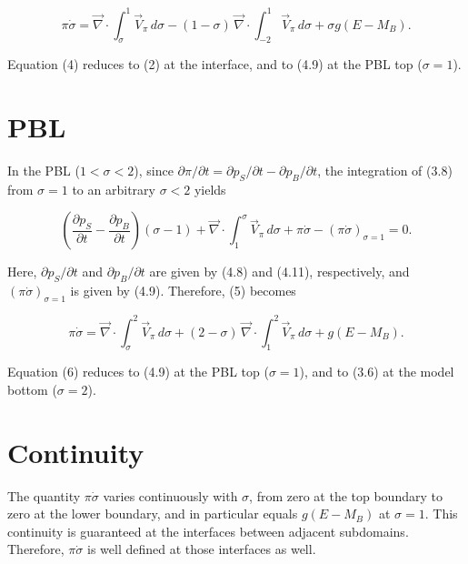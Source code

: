 \documentclass[12pt,openany]{book}
\begin{document}
\begin{equation}
\pi \dot{\sigma}
=
\vec{\nabla} \cdot \int_{\sigma}^{1} \vec{V}_{\pi} \, d\sigma
-
(1 - \sigma)\,
\vec{\nabla} \cdot \int_{-2}^{1} \vec{V}_{\pi} \, d\sigma
+
\sigma g (E - M_B) .
\tag{5.4}
\label{eq:5.4}
\end{equation}

Equation (4) reduces to (2) at the interface, and to (4.9) at the PBL top
($\sigma = 1$).

\section{PBL}

In the PBL ($1 < \sigma < 2$), since
$\partial \pi / \partial t = \partial p_S / \partial t - \partial p_B / \partial t$,
the integration of (3.8) from $\sigma = 1$ to an arbitrary $\sigma < 2$ yields

\begin{equation}
\left(
\frac{\partial p_S}{\partial t}
-
\frac{\partial p_B}{\partial t}
\right)
(\sigma - 1)
+
\vec{\nabla} \cdot \int_{1}^{\sigma} \vec{V}_{\pi} \, d\sigma
+
\pi \dot{\sigma}
-
(\pi \dot{\sigma})_{\sigma=1}
=
0 .
\tag{5.5}
\label{eq:5.5}
\end{equation}

Here,
$\partial p_S / \partial t$ and $\partial p_B / \partial t$
are given by (4.8) and (4.11), respectively,
and $(\pi \dot{\sigma})_{\sigma=1}$ is given by (4.9).
Therefore, (5) becomes

\begin{equation}
\pi \dot{\sigma}
=
\vec{\nabla} \cdot \int_{\sigma}^{2} \vec{V}_{\pi} \, d\sigma
+
(2 - \sigma)\,
\vec{\nabla} \cdot \int_{1}^{2} \vec{V}_{\pi} \, d\sigma
+
g (E - M_B) .
\tag{5.6}
\label{eq:5.6}
\end{equation}

Equation (6) reduces to (4.9) at the PBL top ($\sigma = 1$),
and to (3.6) at the model bottom ($\sigma = 2$).

\section{Continuity}

The quantity $\pi \dot{\sigma}$ varies continuously with $\sigma$,
from zero at the top boundary to zero at the lower boundary,
and in particular equals $g(E - M_B)$ at $\sigma = 1$.
This continuity is guaranteed at the interfaces between adjacent subdomains.
Therefore, $\pi \dot{\sigma}$ is well defined at those interfaces as well.
\end{document}
